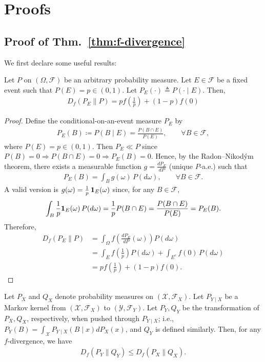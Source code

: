 \section{Proofs}\label{app:proof}
\subsection*{Proof of Thm.~\ref{thm:f-divergence}}

We first declare some useful results: 
\begin{lemma}\label{lemma:f-divergence-conditional}
    \normalfont
    Let $P$ on $(\Omega, \mathcal{F})$ be an arbitrary probability measure. Let $E \in \mathcal{F}$ be a fixed event such that $P(E) = p \in (0,1)$. Let $P_E(\cdot) \triangleq P(\cdot \mid E)$. Then, 
    \begin{align}
        D_{f}(P_E \| P) = pf(\tfrac{1}{p}) + (1-p)f(0)
    \end{align}
\end{lemma}
\begin{proof}
Define the conditional-on-an-event measure $P_E$ by
\begin{align}
P_E(B) \coloneqq P(B\mid E)=\frac{P(B\cap E)}{P(E)},\qquad \forall B\in\mathcal{F},
\end{align}
where $P(E)=p\in(0,1)$. Then $P_E\ll P$ since $P(B)=0\Rightarrow P(B\cap E)=0\Rightarrow P_E(B)=0$.
Hence, by the Radon--Nikodým theorem, there exists a measurable function
$g=\frac{dP_E}{dP}$ (unique $P$-a.e.) such that
\begin{align}
P_E(B)=\int_B g(\omega)\,P(d\omega),\qquad \forall B\in\mathcal{F}.
\end{align}
A valid version is $g(\omega)=\frac{1}{p}\,\boldsymbol{1}_E(\omega)$ since, for any $B\in\mathcal{F}$,
\begin{align}
\int_B \frac{1}{p}\boldsymbol{1}_E(\omega)\,P(d\omega)
=\frac{1}{p}P(B\cap E)=\frac{P(B\cap E)}{P(E)}=P_E(B).
\end{align}
Therefore,
\begin{align}
D_f(P_E\|P)
&=\int_\Omega f\!\left(\frac{dP_E}{dP}(\omega)\right)P(d\omega) \\ 
&=\int_E f\!\left(\frac{1}{p}\right)P(d\omega)+\int_{E^c} f(0)\,P(d\omega) \\
&=pf\!\left(\frac{1}{p}\right)+(1-p)f(0).
\end{align}
\end{proof}

\begin{lemma}\label{lemma:DPI}
    \normalfont
    Let $P_X$ and $Q_X$ denote probability measures on $(\mathcal{X}, \mathcal{F}_X)$. Let $P_{Y \mid X}$ be a Markov kernel from $(\mathcal{X}, \mathcal{F}_X)$ to $(\mathcal{Y}, \mathcal{F}_Y)$. Let $P_Y, Q_Y$ be the transformation of $P_X,Q_X$, respectively, when pushed through $P_{Y\mid X}$; i.e., $P_Y(B) = \int_{\mathcal{X}}P_{Y \mid X}(B \mid x)dP_X(x)$, and $Q_Y$ is defined similarly. Then, for any $f$-divergence, we have  
    \begin{align}
        D_f(P_Y \| Q_Y) \leq D_f(P_X \| Q_X).
    \end{align}
\end{lemma}


